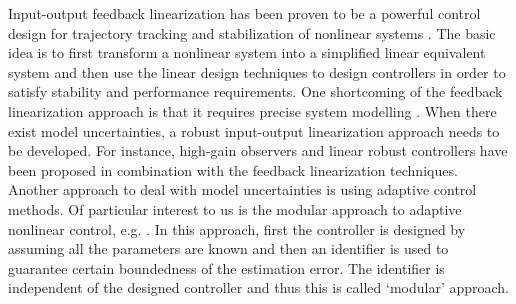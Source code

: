 \documentclass[twoside,leqno,onecolumn]{article}
\begin{document}
Input-output feedback linearization has been proven to be a
powerful control design for trajectory tracking and stabilization
of nonlinear systems \cite{I89}. The basic idea is to first
transform a nonlinear system into a simplified linear equivalent
system and then use the linear design techniques to design
controllers in order to satisfy stability and performance
requirements. One shortcoming of the feedback linearization
approach is that it requires precise system modelling \cite{I89}.
When there exist model uncertainties, a robust input-output
linearization approach needs to be developed. For instance,
high-gain observers \cite{Frei08} and linear robust controllers
\cite{Fran06} have been proposed in combination with the feedback
linearization techniques. Another approach to deal with model
uncertainties is using adaptive control methods. Of particular
interest to us is the modular approach to adaptive nonlinear
control, e.g. \cite{KKK95}. In this approach, first the controller
is designed by assuming all the parameters are known and then an
identifier is used to guarantee certain boundedness of the
estimation error. The identifier is independent of the designed
controller and thus this is called `modular' approach.
\end{document}

